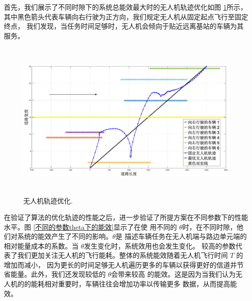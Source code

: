 首先，我们展示了不同时隙下的系统总能效最大时的无人机轨迹优化如图 \ref{无人机轨迹优化}所示，其中黑色箭头代表车辆向右行驶为正方向，我们规定无人机从固定起点飞行至固定终点，
我们发现，当任务时间足够时，无人机会倾向于贴近远离基站的车辆为其服务。
\begin{figure}[H]
\centering
\includegraphics[width=16cm,height=8cm]{..//figures//chap4//小轨迹.eps}   %
\caption{无人机轨迹优化.}
\label{无人机轨迹优化}
\end{figure}

在验证了算法的优化轨迹的性能之后，进一步验证了所提方案在不同参数下的性能水平。图 \ref{不同的参数theta下的能效}显示了在使
用不同的 $\theta$时，在不同时隙，他们对系统的能效产生了不同的影响。$\theta$是
描述车辆任务在无人机端与路边单元端的相对能量成本的系数。当 $\theta$发生变化时，系统效用也会发生变化。
较高的参数代表了我们更加关注无人机的飞行能耗。整体的系统能效随着无人机飞行时间 $T$ 的增加而减小，
因为更长的时间足够无人机遍历更多的车辆以获得更好的信道并节省能量。此外，我们还发现较低的 $\theta$会带来较高
的能效。这是因为当我们认为无人机的的能耗相对重要时，车辆往往会增加功率以传输更多
数据，从而提高能效。

